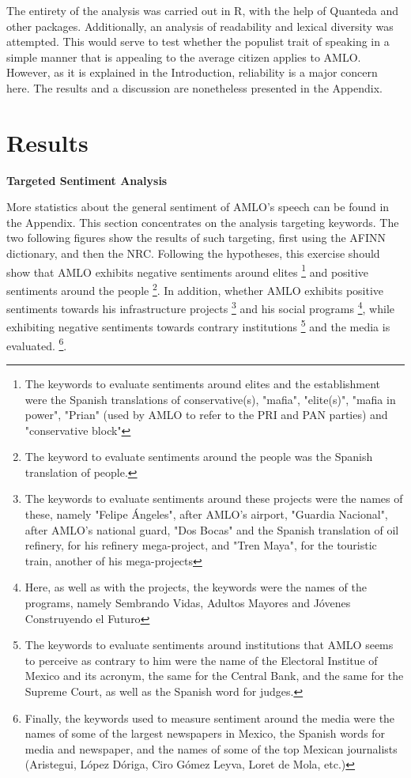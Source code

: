 \documentclass[]{article}
\begin{document}
The entirety of the analysis was carried out in R, with the help of Quanteda \cite{quanteda2018} and other packages. Additionally, an analysis of readability and lexical diversity was attempted. This would serve to test whether the populist trait of speaking in a simple manner that is appealing to the average citizen applies to AMLO. However, as it is explained in the Introduction, reliability is a major concern here. The results and a discussion are nonetheless presented in the Appendix. 

\section{Results}

\vspace{.5cm}
\noindent\textbf{Targeted Sentiment Analysis}
\vspace{.5cm}

\noindent 

More statistics about the general sentiment of AMLO's speech can be found in the Appendix. This section concentrates on the analysis targeting keywords. The two following figures show the results of such targeting, first using the AFINN dictionary, and then the NRC. Following the hypotheses, this exercise should show that AMLO exhibits negative sentiments around elites
\footnote{The keywords to evaluate sentiments around elites and the establishment were the Spanish translations of conservative(s), "mafia", "elite(s)", "mafia in power", "Prian" (used by AMLO to refer to the PRI and PAN parties) and "conservative block"} 
and positive sentiments around the people
\footnote{The keyword to evaluate sentiments around the people was the Spanish translation of people.}. 
In addition, whether AMLO exhibits positive sentiments towards his infrastructure projects
\footnote{The keywords to evaluate sentiments around these projects were the names of these, namely "Felipe Ángeles", after AMLO's airport, "Guardia Nacional", after AMLO's national guard, "Dos Bocas" and the Spanish translation of oil refinery, for his refinery mega-project, and "Tren Maya", for the touristic train, another of his mega-projects} 
and his social programs
\footnote{Here, as well as with the projects, the keywords were the names of the programs, namely Sembrando Vidas, Adultos Mayores and Jóvenes Construyendo el Futuro}, 
while exhibiting negative sentiments towards contrary institutions
\footnote{The keywords to evaluate sentiments around institutions that AMLO seems to perceive as contrary to him were the name of the Electoral Institue of Mexico and its acronym, the same for the Central Bank, and the same for the Supreme Court, as well as the Spanish word for judges.} 
and the media is evaluated.
\footnote{Finally, the keywords used to measure sentiment around the media were the names of some of the largest newspapers in Mexico, the Spanish words for media and newspaper, and the names of some of the top Mexican journalists (Aristegui, López Dóriga, Ciro Gómez Leyva, Loret de Mola, etc.)}. 
\end{document}
